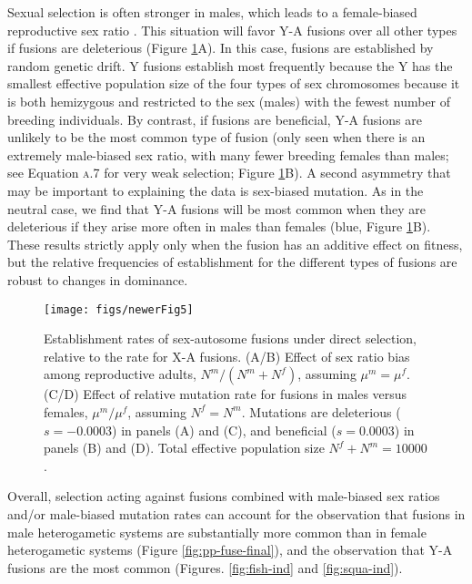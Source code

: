 Sexual selection is often stronger in males, which leads to a female-biased reproductive sex ratio \citep[that is, more reproducing females than males;][]{Bateman1948}. This situation will favor Y-A fusions over all other types if fusions are deleterious (Figure \ref{fig:fuse-direct}A). In this case, fusions are established by random genetic drift. Y fusions establish most frequently because the Y has the smallest effective population size of the four types of sex chromosomes because it is both hemizygous and restricted to the sex (males) with the fewest number of breeding individuals. By contrast, if fusions are beneficial, Y-A fusions are unlikely to be the most common type of fusion (only seen when there is an extremely male-biased sex ratio, with many fewer breeding females than males; see Equation \textsc{a.7} for very weak selection; Figure \ref{fig:fuse-direct}B). A second asymmetry that may be important to explaining the data is sex-biased mutation. As in the neutral case, we find that Y-A fusions will be most common when they are deleterious if they arise more often in males than females (blue, Figure \ref{fig:fuse-direct}B). These results strictly apply only when the fusion has an additive effect on fitness, but the relative frequencies of establishment for the different types of fusions are robust to changes in dominance.

\begin{figure}
\centering
\texttt{[image: figs/newerFig5]}
\caption[Establishment rates of sex-autosome fusions under direct selection]{Establishment rates of sex-autosome fusions under direct selection, relative to the rate for X-A fusions. (A/B) Effect of sex ratio bias among reproductive adults, $N^m/(N^m + N^f)$, assuming $\mu^m=\mu^f$. (C/D) Effect of relative mutation rate for fusions in males versus females, $\mu^m/\mu^f$, assuming $N^f=N^m$. Mutations are deleterious ($s=-\text{0.0003}$) in panels (A) and (C), and beneficial ($s=\text{0.0003}$) in panels (B) and (D). Total effective population size $N^f+N^m=\text{10000}$.}
\label{fig:fuse-direct}
\end{figure}

Overall, selection acting against fusions combined with male-biased sex ratios and/or male-biased mutation rates can account for the observation that fusions in male heterogametic systems are substantially more common than in female heterogametic systems (Figure \ref{fig:pp-fuse-final}), and the observation that Y-A fusions are the most common (Figures. \ref{fig:fish-ind} and \ref{fig:squa-ind}). 

